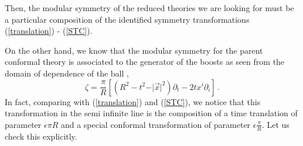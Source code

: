 \documentclass[12pt,a4paper]{article}
\begin{document}
Then, the modular symmetry of the reduced theories we are looking for must be a particular composition of the identified symmetry transformations (\ref{translation}) - (\ref{STC}).

On the other hand, we know that the modular symmetry for the parent conformal theory is associated to the generator of the boosts as seen from the domain of dependence of the ball \cite{VanRaamsdonk:2016exw},
\begin{equation}
\zeta=\frac{\pi}{R}\left[(R^2-t^2-\vert \vec{x}\vert^2)\partial_t-2 t x^i \partial_i\right]\,.
\end{equation}
In fact, comparing with (\ref{translation}) and (\ref{STC}), we notice that this transformation in the semi infinite line is the composition of a time translation of parameter $\epsilon\pi R$ and a special conformal transformation of parameter $\epsilon\frac{\pi}{R}$. Let us check this explicitly.
\end{document}
